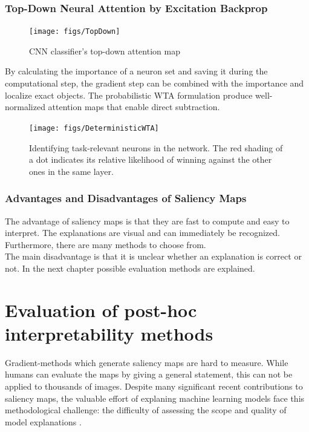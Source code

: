\subsection{Top-Down Neural Attention by Excitation Backprop \cite{article}}

\begin{figure}[h!]
	\centering
	\texttt{[image: figs/TopDown]}
	\caption{CNN classifier's top-down attention map \cite{article}}
	\label{fig:topdown}
\end{figure}

By calculating the importance of a neuron set and saving it during the computational step, the gradient step can be combined with the importance and localize exact objects.
The probabilistic WTA formulation produce well-normalized attention maps that enable direct subtraction.


\begin{figure}[h!]
	\centering
	\texttt{[image: figs/DeterministicWTA]}
	\caption{Identifying task-relevant neurons in the network. The red shading of a dot indicates its relative likelihood of winning against the other ones in the same layer. \cite{article}}
	\label{fig:taskrelevant}
\end{figure}

\subsection{Advantages and Disadvantages of Saliency Maps}

The advantage of saliency maps is that they are fast to compute and easy to interpret. The explanations are visual and can immediately be recognized. Furthermore, there are many methods to choose from.
\\
The main disadvantage is that it is unclear whether an explanation is correct or not. In the next chapter possible evaluation methods are explained.



\chapter{Evaluation of post-hoc interpretability methods}

Gradient-methods which generate saliency maps are hard to measure. While humans can evaluate the maps by giving a general statement, this can not be applied to thousands of images. Despite many significant recent contributions to saliency maps, the valuable effort of explaning machine learning models face this methodological challenge: the difficulty of assessing the scope and quality of model explanations \cite{adebayo2020sanity}.





